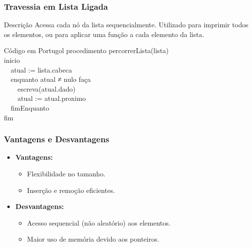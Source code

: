 \begin{frame}[fragile]
  \frametitle{Travessia em Lista Ligada}
  \begin{block}{Descrição}
    Acessa cada nó da lista sequencialmente. Utilizado para imprimir todos os elementos, ou para aplicar uma função a cada elemento da lista.
  \end{block}
  \small
  \begin{block}{Código em Portugol}
    procedimento percorrerLista(lista) \\
    inicio \\
    \ \ atual := lista.cabeca \\
    \ \ enquanto atual ≠ nulo faça \\
    \ \ \ \ escreva(atual.dado) \\
    \ \ \ \ atual := atual.proximo \\
    \ \ fimEnquanto \\
    fim
  \end{block}
\end{frame}

\begin{frame}[fragile]
\frametitle{Vantagens e Desvantagens}
\begin{itemize}
\item \textbf{Vantagens:}
\begin{itemize}
\item Flexibilidade no tamanho.
\item Inserção e remoção eficientes.
\end{itemize}
\item \textbf{Desvantagens:}
\begin{itemize}
\item Acesso sequencial (não aleatório) aos elementos.
\item Maior uso de memória devido aos ponteiros.
\end{itemize}
\end{itemize}
\end{frame}

